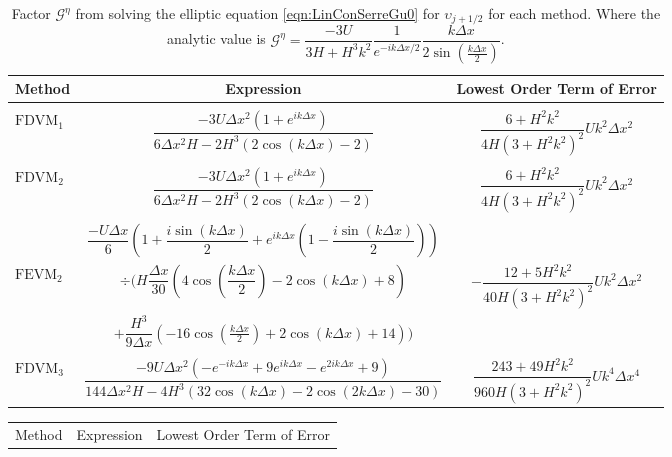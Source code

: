 \begin{landscape}
	\begin{table}
		\begin{tabular}{l  c  c}
			Method& Expression& Lowest Order Term of Error \T \B\\
			\hline  \\
			$\text{FDVM}_1$& $\dfrac{-3 U\Delta x^2 \left(1 + e^{ik\Delta x}\right)}{6\Delta x^2 H - 2H^3 \left(2\cos\left(k\Delta x\right) - 2\right)}$ & $\dfrac{6 +H^2k^2}{4H \left(3 + H^2k^2\right)^2}Uk^2 \Delta x^2$  \\ \\
			$\text{FDVM}_2$& $\dfrac{-3U \Delta x^2 \left({1 + e^{ik\Delta x}}\right)}{6 \Delta x^2 H - 2H^3 \left(2\cos\left(k\Delta x\right) - 2\right)}$ & $\dfrac{6 +H^2k^2}{4H \left(3 + H^2k^2\right)^2}Uk^2 \Delta x^2$  \\ \\
			& $\dfrac{-U\Delta x}{6} \left(1 + \dfrac{i \sin\left(k \Delta x\right)}{2} + e^{ik\Delta x}\left(1 - \dfrac{i \sin\left(k \Delta x\right)}{2}\right) \right)$ & \\  $\text{FEVM}_2$ & $\div  \Bigg( H\dfrac{\Delta x}{30} \left(4\cos\left(\dfrac{k \Delta x}{2}\right) - 2\cos\left({k \Delta x}\right) + 8\right) $  & $-\dfrac{12 + 5H^2k^2}{40H \left(3 + H^2k^2\right)^2}Uk^2 \Delta x^2$ \\ &$+ \dfrac{H^3 }{9\Delta x}\left(-16\cos\left(\frac{k\Delta x}{2}\right) + 2 \cos\left(k \Delta x\right) + 14\right)    \Bigg)$ & \\ \\
			$\text{FDVM}_3$&  $\dfrac{-9U \Delta x^2 \left({-e^{-ik\Delta x} + 9e^{ik\Delta x} - e^{2ik\Delta x} + 9}\right)}{144 \Delta x^2H - 4H^3\left(32\cos\left(k \Delta x\right) -2\cos\left(2k \Delta x\right) - 30\right)}$ & $\dfrac{243 + 49H^2k^2}{960H\left(3 + H^2k^2\right)^2}Uk^4 \Delta x^4$ \T \B \\
			\hline
		\end{tabular}
		\caption{Factor $\mathcal{G}^\eta$ from solving the elliptic equation \eqref{eqn:LinConSerreGu0} for $\upsilon_{j+1/2}$ for each method. Where the analytic value is  $\mathcal{G}^\eta = \dfrac{-3U }{3H + H^3k^2} \dfrac{1}{e^{-ik\Delta x/2}} \dfrac{k\Delta x}{2 \sin\left(\frac{k \Delta x}{2}\right)}$.}
		\label{tab:Gnfactor} 
	\end{table}
\begin{table}
	\begin{tabular}{l  c  c}
		Method& Expression& Lowest Order Term of Error \T \B\\

\end{tabular}
\end{table}
\end{landscape}
